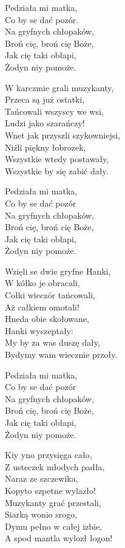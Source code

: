 \begin{text}
Pedziała mi matka,\\
Co by se dać pozór.\\
Na gryfnych chłopaków,\\
Broń cię, broń cię Boże,\\
Jak cię taki obłapi,\\
Żodyn niy pomoże.

W karczmie grali muzykanty,\\
Przeca są już ostatki,\\
Tańcowali wszyscy we wsi,\\
Ludzi jako szarańczy!\\
Wnet jak przyszli szykowniejsi,\\
Niźli piękny łobrozek,\\
Wszystkie wtedy postawały,\\
Wszystkie by się zabić dały.

Pedziała mi matka,\\
Co by se dać pozór\\
Na gryfnych chłopaków,\\
Broń cię, broń cię Boże,\\
Jak cię taki obłapi, \\
Żodyn niy pomoże.

Wzięli se dwie gryfne Hanki,\\
W kółko je obracali,\\
Cołki wieczór tańcowali,\\
Aż całkiem omotali!\\
Hneda obie skołowane,\\
Hanki wyszeptały:\\
My by za was duszę dały,\\
Bydymy wam wiecznie przoły.

Pedziała mi matka,\\
Co by se dać pozór\\
Na gryfnych chłopaków,\\
Broń cię, broń cię Boże,\\
Jak cię taki obłapi, \\
Żodyn niy pomoże.

Kiy yno przysięga cało,\\
Z usteczek młodych padła,\\
Naraz ze szczewika,\\
Kopyto szpetne wylazło!\\
Muzykanty grać przestali,\\
Siarką wonio srogo,\\
Dymu pełno w całej izbie,\\
A spod mantla wylozł łogon!


\end{text}
